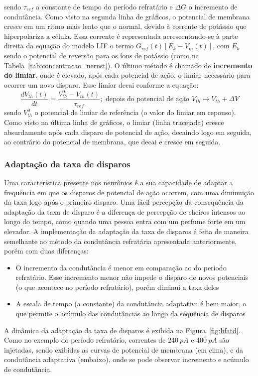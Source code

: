 sendo $\tau_{ref}$ a constante de tempo do período refratário e $\Delta G$ o incremento de condutância. Como visto na segunda linha de gráficos, o potencial de membrana cresce em um ritmo mais lento que o normal, devido à corrente de potássio que hiperpolariza a célula. Essa corrente é representada acrescentando-se à parte direita da equação do modelo LIF o termo $G_{ref}(t)[E_k-V_m(t)]$, com $E_k$ sendo o potencial de reversão para os íons de potássio (como na Tabela~\ref{tab:concentracao_nernst}). O último método é chamado de \textbf{incremento do limiar}, onde é elevado, após cada potencial de ação, o limiar necessário para ocorrer um novo disparo. Esse limiar decai conforme a equação:
\begin{equation}\label{eq:incremento_limiar}
	\frac{dV_{th}(t)}{dt} = \frac{V^0_{th}-V_{th}(t)}{\tau_{ref}};\text{ depois do potencial de ação } V_{th} \mapsto V_{th} + \Delta V
\end{equation}
sendo $V^0_{th}$ o potencial de limiar de referência (o valor do limiar em repouso). Como visto na última linha de gráficos, o limiar (linha tracejada) cresce absurdamente após cada disparo de potencial de ação, decaindo logo em seguida, ao contrário do potencial de membrana, que decai e cresce em seguida. 

\subsubsection{Adaptação da taxa de disparos}
Uma característica presente nos neurônios é a sua capacidade de adaptar a frequência em que os disparos de potencial de ação ocorrem, com uma diminuição da taxa logo após o primeiro disparo. Uma fácil percepção da consequência da adaptação da taxa de disparo é a diferença de percepção de cheiros intensos ao longo do tempo, como quando uma pessoa entra com um perfume forte em um elevador. A implementação da adaptação da taxa de disparos é feita de maneira semelhante ao método da condutância refratária apresentada anteriormente, porém com duas diferenças:
\begin{itemize}
	\item O incremento da condutância é menor em comparação ao do período refratário. Esse incremento menor não impede o disparo de novos potenciais (o que acontece no período refratário), porém diminui a taxa deles
	\item A escala de tempo (a constante) da condutância adaptativa é bem maior, o que permite o acúmulo das condutâncias ao longo da sequência de disparos
\end{itemize}
A dinâmica da adaptação da taxa de disparos é exibida na Figura~\ref{fig:lifatd}. Como no exemplo do período refratário, correntes de $240\ pA$ e $400\ pA$ são injetadas, sendo exibidas as curvas de potencial de membrana (em cima), e da condutância adaptativa (embaixo), onde se pode observar incremento e acúmulo de condutância.

